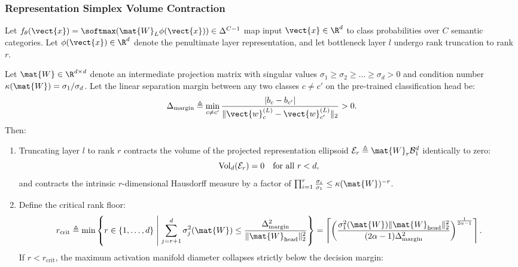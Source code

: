 \subsubsection{Representation Simplex Volume Contraction}
Let $f_\theta(\vect{x}) = \softmax(\mat{W}_L \phi(\vect{x})) \in \Delta^{C-1}$ map input $\vect{x} \in \R^d$ to class probabilities over $C$ semantic categories. Let $\phi(\vect{x}) \in \R^d$ denote the penultimate layer representation, and let bottleneck layer $l$ undergo rank truncation to rank $r$.

\begin{theorem}
\label{thm:majority_class_collapse}
Let $\mat{W} \in \R^{d \times d}$ denote an intermediate projection matrix with singular values $\sigma_1 \ge \sigma_2 \ge \dots \ge \sigma_d > 0$ and condition number $\kappa(\mat{W}) = \sigma_1 / \sigma_d$. Let the linear separation margin between any two classes $c \neq c'$ on the pre-trained classification head be:
\begin{equation}
\Delta_{\text{margin}} \triangleq \min_{c \neq c'} \frac{|b_c - b_{c'}|}{\|\vect{w}_c^{(L)} - \vect{w}_{c'}^{(L)}\|_2} > 0.
\label{eq:margin_def}
\end{equation}
Then:
\begin{enumerate}
    \item Truncating layer $l$ to rank $r$ contracts the volume of the projected representation ellipsoid $\mathcal{E}_r \triangleq \mat{W}_r \mathcal{B}_1^d$ identically to zero:
    \begin{equation}
    \operatorname{Vol}_d(\mathcal{E}_r) = 0 \quad \text{for all } r < d,
    \label{eq:ellipsoid_volume_zero}
    \end{equation}
    and contracts the intrinsic $r$-dimensional Hausdorff measure by a factor of $\prod_{i=1}^r \frac{\sigma_i}{\sigma_1} \le \kappa(\mat{W})^{-r}$.
    \item Define the critical rank floor:
    \begin{equation}
    r_{\text{crit}} \triangleq \min \left\{ r \in \{1, \dots, d\} \;\middle|\; \sum_{j=r+1}^d \sigma_j^2(\mat{W}) \le \frac{\Delta_{\text{margin}}^2}{\|\mat{W}_{\text{head}}\|_2^2} \right\} = \left\lceil \left( \frac{\sigma_1^2(\mat{W}) \|\mat{W}_{\text{head}}\|_2^2}{(2\alpha - 1) \Delta_{\text{margin}}^2} \right)^{\frac{1}{2\alpha - 1}} \right\rceil.
    \label{eq:rcrit_definition}
    \end{equation}
    If $r < r_{\text{crit}}$, the maximum activation manifold diameter collapses strictly below the decision margin:

\end{enumerate}
\end{theorem}
